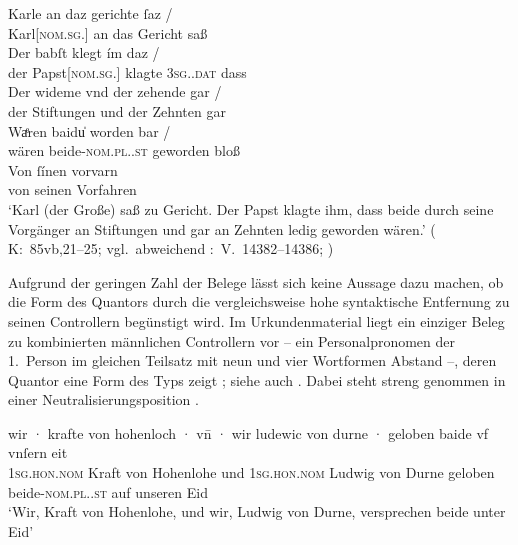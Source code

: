 \begin{exe}
\ex \label{ex:baideuwarn3}
	\gll Karle an daz gerichte ſaz {/} \\
	    Karl[\textsc{nom.sg.\MascM}] an das Gericht saß \\
	\gll Der babſt klegt ím daz {/} \\
		der Papst[\textsc{nom.sg.\MascM}] klagte \textsc{3sg.\MascM.dat} dass \\
	\gll Der wideme vnd der zehende gar {/} \\
		der Stiftungen und der Zehnten gar \\
	\gll Waͤren baidu̍ worden bar {/} \\
		wären beide-\textsc{nom.pl.\NeutM.st} geworden bloß \\
	\gll Von ſínen vorvarn \\
		von seinen Vorfahren \\
	\trans `Karl (der Große) saß zu Gericht. Der Papst klagte ihm, dass
		beide durch seine Vorgänger an Stiftungen und gar an Zehnten ledig
		geworden wären.'
		(%
			K:~85vb,21--25; vgl.~abweichend
			\KC:~V.~14382--14386;
			\cite[341]{schroeder1895}%
		)
\end{exe}

Aufgrund der geringen Zahl der Belege lässt sich keine Aussage dazu machen, ob
die Form des Quantors durch die vergleichsweise hohe syntaktische Entfernung zu
seinen Controllern begünstigt wird. Im Urkundenmaterial liegt ein einziger
Beleg zu kombinierten männlichen Controllern vor -- ein Personalpronomen der
1.~Person im gleichen Teilsatz mit neun und vier Wortformen Abstand --, deren
Quantor eine Form des Typs  zeigt ; siehe auch
. Dabei steht  streng genommen in einer
Neutralisierungsposition
\autocites[vgl.][90--91]{askedal1973}[191]{gjelsten1980}.

\begin{exe}
\ex\label{ex:1sg1sgbeide}
	\gll wir · krafte von hohenloch · vn̄ · wir
		ludewic von durne · geloben baide vf vnſern eit \\
		\textsc{1sg\subM.hon.nom} {} Kraft von Hohenlohe {} und {}
		\textsc{1sg\subM.hon.nom} Ludwig von Durne {} geloben
		beide-\textsc{nom.pl.\MascM.st} auf unseren Eid \\
	\trans `Wir, Kraft von Hohenlohe, und wir, Ludwig von Durne,
		versprechen beide unter Eid'
		\parencites(Nr.~2529, Burg Hohlach, Kr.~Neustadt an der Aisch-Bad Windsheim, 1296)[563,5--6]{cao3}%
\end{exe}

